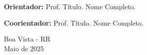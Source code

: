 \begin{titlepage}
\begin{center}
        \begin{flushright}
            \parbox{9cm}{\setlength{\parindent}{0pt}
            \textbf{Orientador:} Prof. Título. Nome Completo.
            }
        \end{flushright}

        \begin{flushright}
            \parbox{9cm}{\setlength{\parindent}{0pt}
            \textbf{Coorientador:} Prof. Título. Nome Completo.
            }
        \end{flushright}

        \vfill

        {\large Boa Vista - RR\\
        Maio de 2025}
    \end{center}
\end{titlepage}
